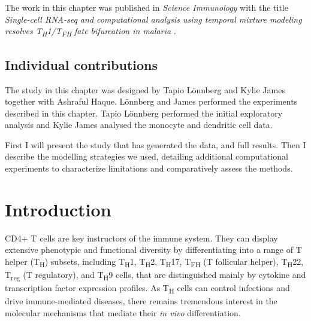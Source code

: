 The work in this chapter was published in \textit{Science Immunology} with the title \textit{Single-cell RNA-seq and computational analysis using temporal mixture modeling resolves T\textsubscript{H}1/T\textsubscript{FH} fate bifurcation in malaria} \cite{Lonnberg2017-cp}.

\subsection*{Individual contributions}

The study in this chapter was designed by Tapio L\"{o}nnberg and Kylie James together with Ashraful Haque. L\"{o}nnberg and James performed the experiments described in this chapter. Tapio L\"{o}nnberg performed the initial exploratory analysis and Kylie James analysed the monocyte and dendritic cell data.

First I will present the study that has generated the data, and full results. Then I describe the modelling strategies we used, detailing additional computational experiments to characterize limitations and comparatively assess the methods.

\section{Introduction}

CD4+ T cells are key instructors of the immune system. They can display extensive phenotypic and functional diversity by differentiating into a range of T helper (T\textsubscript{H}) subsets, including T\textsubscript{H}1, T\textsubscript{H}2, T\textsubscript{H}17, T\textsubscript{FH} (T follicular helper), T\textsubscript{H}22, T\textsubscript{reg} (T regulatory), and T\textsubscript{H}9 cells, that are distinguished mainly by cytokine and transcription factor expression profiles. As T\textsubscript{H} cells can control infections and drive immune-mediated diseases, there remains tremendous interest in the molecular mechanisms that mediate their \textit{in vivo} differentiation.

